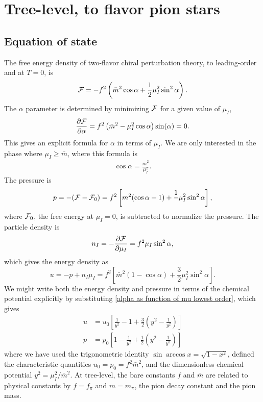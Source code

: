 \section{Tree-level, to flavor pion stars}


\subsection{Equation of state}
The free energy density of two-flavor chiral perturbation theory, to leading-order and at $T = 0$, is
%
\begin{equation}
    \mathcal{F} = - f^2 \left(\bar m^2 \cos \alpha + \frac{1}{2} \mu_I^2 \sin^2 \alpha\right).
\end{equation}
%
The $\alpha$ parameter is determined by minimizing $\mathcal{F}$ for a given value of $\mu_I$,
%
\begin{equation}
    \pdv{\mathcal{F}}{\alpha} = f^2 \left(\bar m^2 - \mu_I^2 \cos \alpha\right) \sin(\alpha) = 0.
\end{equation}
%
This gives an explicit formula for $\alpha$ in terms of $\mu_I$.
We are only interested in the phase where $\mu_I \geq \bar m$, where this formula is
%
\begin{align}
    \label{alpha as function of mu lowest order}
    \cos \alpha = \frac{\bar m^2}{\mu_I^2}.
\end{align}
%
The pressure is
%
\begin{equation}
    p = -(\mathcal{F} - \mathcal{F}_0) 
    = f^2 \left[m^2(\cos \alpha - 1) + \frac{1}{}\mu_I^2 \sin^2 \alpha\right],
\end{equation}
%
where $\mathcal{F}_0$, the free energy at $\mu_I = 0$, is subtracted to normalize the pressure.
The particle density is
%
\begin{equation}
    n_I = -\pdv{\mathcal{F}}{\mu_I} = f^2 \mu_I \sin^2 \alpha,
\end{equation}
%
which gives the energy density as
%
\begin{equation}
    u = -p + n_I \mu_I 
    = f^2\left[\bar m^2(1 - \cos \alpha )+ \frac{3}{2} \mu_I^2 \sin^2 \alpha\right].
\end{equation}
%
We might write both the energy density and pressure in terms of the chemical potential explicitly by substituting \autoref{alpha as function of mu lowest order}, which gives
%
\begin{align}
    u &= u_0
    \left[ 
        \frac{1}{y^2} - 1 + \frac{3}{2} \left(y^2 - \frac{1}{y^2}\right)
        \right] \\
    p &= p_0\left[ 1 - \frac{1}{y^2} + \frac{1}{2} \left(y^2 - \frac{1}{y^2}\right)\right]
\end{align}
%
where we have used the trigonometric identity $\sin \arccos x = \sqrt{1 - x^2}$, defined the characteristic quantities $u_0 = p_0 = f^2 \bar m^2$, and the dimensionless chemical potential $y^2 = \mu_I^2 / \bar m^2$.
At tree-level, the bare constants $f$ and $\bar m$ are related to physical constants by $f = f_\pi$ and $m = m_\pi$, the pion decay constant and the pion mass.


